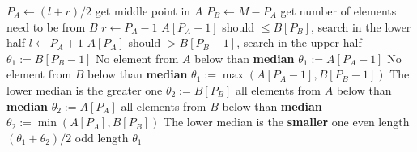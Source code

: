 \documentclass[a4paper,12pt]{article}
\begin{document}
\begin{algorithm}[H]
\begin{algorithmic}[1]
\State $P_A \gets (l+r)/2$ \Comment get middle point in $A$
\State $P_B \gets M - P_A$ \Comment get number of elements need to be from $B$
\State $r \gets P_A -1 $ \Comment $A[P_A-1]$ should $\leq B[P_B]$, search in the lower half
\State $l \gets P_A +1 $ \Comment $A[P_A]$ should $ > B[P_B - 1]$, search in the upper half
\Else
{}
\State $\theta_1 := B[P_B-1]$ \Comment No element from $A$ below than \textbf{median}
\State $\theta_1 := A[P_A-1]$ \Comment No element from $B$ below than \textbf{median}
\Else 
\State $\theta_1 := \max(A[P_A - 1], B[P_B-1])$ \Comment The lower median is the greater one
\EndIf
{}
\State $\theta_2 := B[P_B]$ \Comment all elements from $A$ below than \textbf{median}
\State $\theta_2 := A[P_A]$ \Comment all elements from $B$ below than \textbf{median}
\Else
\State $\theta_2 := \min(A[P_A], B[P_B])$ \Comment The lower median is the \textbf{smaller} one
\EndIf
\EndIf
{} \Comment even length
\State \Return $(\theta_1 + \theta_2)/2$
\Else \Comment odd length
\State \Return $\theta_1$
\EndIf
\EndWhile
\EndProcedure
\Statex
\end{algorithmic}
\end{algorithm}
\end{document}
